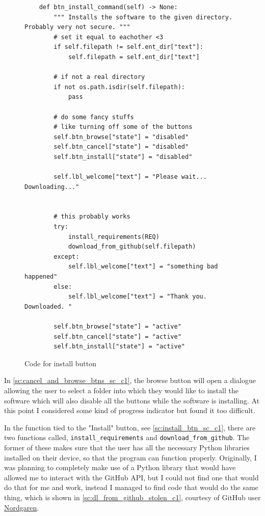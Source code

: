 \documentclass[11pt]{article}
\begin{document}
                \begin{figure}[!ht]
                    \begin{verbatim}
    def btn_install_command(self) -> None:
        """ Installs the software to the given directory. Probably very not secure. """
        # set it equal to eachother <3
        if self.filepath != self.ent_dir["text"]:
            self.filepath = self.ent_dir["text"]
            
        # if not a real directory
        if not os.path.isdir(self.filepath):
            pass
        
        # do some fancy stuffs
        # like turning off some of the buttons
        self.btn_browse["state"] = "disabled"
        self.btn_cancel["state"] = "disabled"
        self.btn_install["state"] = "disabled"
        
        self.lbl_welcome["text"] = "Please wait... Downloading..."
        
        
        # this probably works
        try:
            install_requirements(REQ)
            download_from_github(self.filepath)
        except:
            self.lbl_welcome["text"] = "something bad happened"
        else:
            self.lbl_welcome["text"] = "Thank you. Downloaded. "
        
        self.btn_browse["state"] = "active"
        self.btn_cancel["state"] = "active"
        self.btn_install["state"] = "active"
                    \end{verbatim}
                    \caption{Code for install button}
                    \label{sc:install_btn_sc_c1}
                \end{figure}


                In \autoref{sc:cancel_and_browse_btns_sc_c1}, the browse button will open a dialogue allowing the user to select a folder into which they would like to install the software which will also disable all the buttons while the software is installing. At this point I considered some kind of progress indicator but found it too difficult.


                In the function tied to the "Install" button, see \autoref{sc:install_btn_sc_c1}, there are two functions called, \verb|install_requirements| and \verb|download_from_github|. The former of these makes sure that the user has all the necessary Python libraries installed on their device, so that the program can function properly. Originally, I was planning to completely make use of a Python library that would have allowed me to interact with the GitHub API, but I could not find one that would do that for me and work, instead I managed to find code that would do the same thing, which is shown in \autoref{sc:dl_from_github_stolen_c1}, courtesy of GitHub user \href{https://github.com/Nordgaren/Github-Folder-Downloader/tree/master}{Nordgaren}.
\end{document}
